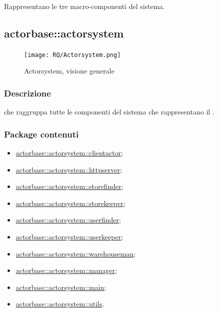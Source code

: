 \documentclass{scalatekids-article}
\begin{document}
Rappresentano le tre macro-componenti del sistema.


\subsection{actorbase::actorsystem} %
\label{sec:actorbase::actorsystem}

\begin{figure}[H]
  \begin{center}
    \texttt{[image: RQ/Actorsystem.png]}
    \caption{Actorsystem, visione generale}
  \end{center}
\end{figure}

\subsubsection{Descrizione}

 che raggruppa tutte le componenti del sistema che
rappresentano il .

\subsubsection{Package contenuti}

\begin{itemize}
\item \hyperref[sec:actorbase::actorsystem::clientactor]{actorbase::actorsystem::clientactor};
\item \hyperref[sec:actorbase::actorsystem::httpserver]{actorbase::actorsystem::httpserver};
\item \hyperref[sec:actorbase::actorsystem::storefinder]{actorbase::actorsystem::storefinder};
\item \hyperref[sec:actorbase::actorsystem::storekeeper]{actorbase::actorsystem::storekeeper};
\item \hyperref[sec:actorbase::actorsystem::userfinder]{actorbase::actorsystem::userfinder};
\item \hyperref[sec:actorbase::actorsystem::userkeeper]{actorbase::actorsystem::userkeeper};
\item \hyperref[sec:actorbase::actorsystem::warehouseman]{actorbase::actorsystem::warehouseman};
\item \hyperref[sec:actorbase::actorsystem::manager]{actorbase::actorsystem::manager};
\item \hyperref[sec:actorbase::actorsystem::main]{actorbase::actorsystem::main};
\item \hyperref[sec:actorbase::actorsystem::utils]{actorbase::actorsystem::utils}.
\end{itemize}
\end{document}
